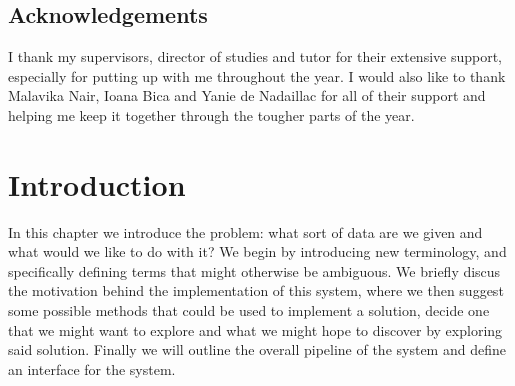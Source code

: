 \documentclass[12pt,twoside,notitlepage]{report}
\begin{document}

\listoffigures

\listoftables

\lstlistoflistings











\clearpage
\section*{Acknowledgements}

I thank my supervisors, director of studies and tutor for their extensive support, especially for putting up with me 
throughout the year. I would also like to thank Malavika Nair, Ioana Bica and Yanie de Nadaillac for all of their 
support and helping me keep it together through the tougher parts of the year.











\cleardoublepage        %

\setcounter{page}{1}
\pagestyle{headings}
















\cleardoublepage
\chapter{Introduction}
    In this chapter we introduce the problem: what sort of data are we given and what would we like to do with it? We 
    begin by introducing new terminology, and specifically defining terms that might otherwise be ambiguous. We briefly 
    discus the motivation behind the implementation of this system, where we then suggest some possible methods that 
    could be used to implement a solution, decide one that we might want to explore and what we might hope to discover 
    by exploring said solution. Finally we will outline the overall pipeline of the system and define an interface for 
    the system.
\end{document}

